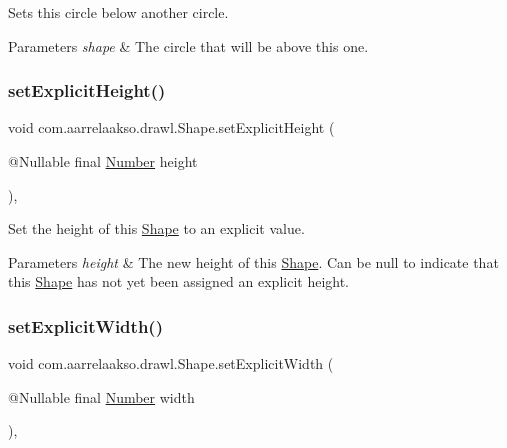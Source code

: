 Sets this circle below another circle. 


\begin{DoxyParams}{Parameters}
{\em shape} & The circle that will be above this one. \\
\hline
\end{DoxyParams}
\mbox{\label{classcom_1_1aarrelaakso_1_1drawl_1_1_shape_a3680a63cef0d766132d1f64813ca8eca}} 
\subsubsection{\texorpdfstring{set\+Explicit\+Height()}{setExplicitHeight()}}
{\footnotesize\ttfamily void com.\+aarrelaakso.\+drawl.\+Shape.\+set\+Explicit\+Height (\begin{DoxyParamCaption}\item[{@Nullable final \hyperlink{interfacecom_1_1aarrelaakso_1_1drawl_1_1_number}{Number}}]{height }\end{DoxyParamCaption})\hspace{0.3cm}{\ttfamily [protected]}, {\ttfamily [inherited]}}



Set the height of this \hyperlink{classcom_1_1aarrelaakso_1_1drawl_1_1_shape}{Shape} to an explicit value. 


\begin{DoxyParams}{Parameters}
{\em height} & The new height of this \hyperlink{classcom_1_1aarrelaakso_1_1drawl_1_1_shape}{Shape}. Can be {\ttfamily null} to indicate that this \hyperlink{classcom_1_1aarrelaakso_1_1drawl_1_1_shape}{Shape} has not yet been assigned an explicit height. \\
\hline
\end{DoxyParams}
\mbox{\label{classcom_1_1aarrelaakso_1_1drawl_1_1_shape_a386685477bfc007aab782565f140265d}} 
\subsubsection{\texorpdfstring{set\+Explicit\+Width()}{setExplicitWidth()}}
{\footnotesize\ttfamily void com.\+aarrelaakso.\+drawl.\+Shape.\+set\+Explicit\+Width (\begin{DoxyParamCaption}\item[{@Nullable final \hyperlink{interfacecom_1_1aarrelaakso_1_1drawl_1_1_number}{Number}}]{width }\end{DoxyParamCaption})\hspace{0.3cm}{\ttfamily [protected]}, {\ttfamily [inherited]}}



